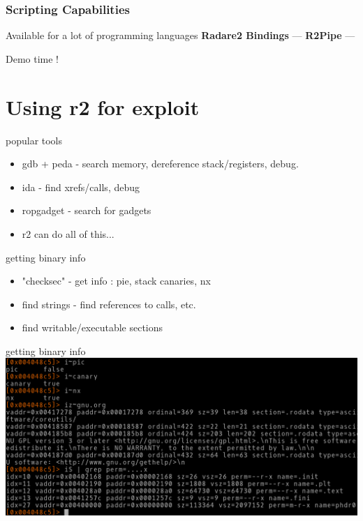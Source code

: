 \documentclass[10pt,pdf,utf8,english,compress,hyperref={unicode}]{beamer}
\begin{document}
\begin{frame}[fragile]
  \frametitle{Scripting Capabilities}
  \center Available for a lot of programming languages
  \center\textbf{Radare2 Bindings} —
  \center\textbf{R2Pipe} —
  \noindent\makebox[\linewidth]{\rule{\paperwidth}{0.4pt}}
  \item Demo time !
\end{frame}

\section{Using r2 for exploit}
\begin{frame}{popular tools}
	\begin{itemize}
		\item gdb + peda - search memory, dereference stack/registers, debug.
		\item ida - find xrefs/calls, debug
		\item ropgadget - search for gadgets
		\item r2 can do all of this...
	\end{itemize}
\end{frame}

\begin{frame}{getting binary info}
	\begin{itemize}
		\item "checksec" - get info : pie, stack canaries, nx
		\item find strings - find references to calls, etc.
		\item find writable/executable sections
	\end{itemize}
\end{frame}

\begin{frame}{getting binary info}
	\includegraphics[width=\textwidth]{cr_images/bin-info.png}
\end{frame}
\end{document}
